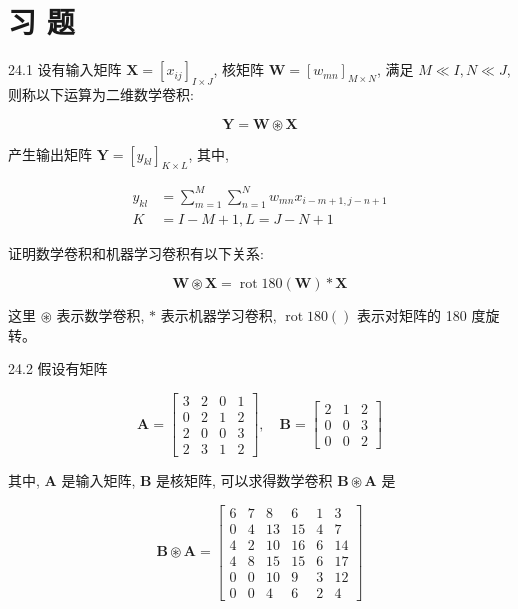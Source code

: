 \documentclass[10pt]{article}
\begin{document}
\section*{习 题}
24.1 设有输入矩阵 $\boldsymbol{X}=\left[x_{i j}\right]_{I \times J}$, 核矩阵 $\boldsymbol{W}=\left[w_{m n}\right]_{M \times N}$, 满足 $M \ll I, N \ll J$, 则称以下运算为二维数学卷积:

$$
\boldsymbol{Y}=\boldsymbol{W} \circledast \boldsymbol{X}
$$

产生输出矩阵 $\boldsymbol{Y}=\left[y_{k l}\right]_{K \times L}$, 其中,

$$
\begin{aligned}
y_{k l} & =\sum_{m=1}^{M} \sum_{n=1}^{N} w_{m n} x_{i-m+1, j-n+1} \\
K & =I-M+1, L=J-N+1
\end{aligned}
$$

证明数学卷积和机器学习卷积有以下关系:

$$
\boldsymbol{W} \circledast \boldsymbol{X}=\operatorname{rot} 180(\boldsymbol{W}) * \boldsymbol{X}
$$

这里 $\circledast$ 表示数学卷积, $*$ 表示机器学习卷积, $\operatorname{rot} 180()$ 表示对矩阵的 180 度旋转。

24.2 假设有矩阵

$$
\boldsymbol{A}=\left[\begin{array}{llll}
3 & 2 & 0 & 1 \\
0 & 2 & 1 & 2 \\
2 & 0 & 0 & 3 \\
2 & 3 & 1 & 2
\end{array}\right], \quad \boldsymbol{B}=\left[\begin{array}{lll}
2 & 1 & 2 \\
0 & 0 & 3 \\
0 & 0 & 2
\end{array}\right]
$$

其中, $\boldsymbol{A}$ 是输入矩阵, $\boldsymbol{B}$ 是核矩阵, 可以求得数学卷积 $\boldsymbol{B} \circledast \boldsymbol{A}$ 是

$$
\boldsymbol{B} \circledast \boldsymbol{A}=\left[\begin{array}{cccccc}
6 & 7 & 8 & 6 & 1 & 3 \\
0 & 4 & 13 & 15 & 4 & 7 \\
4 & 2 & 10 & 16 & 6 & 14 \\
4 & 8 & 15 & 15 & 6 & 17 \\
0 & 0 & 10 & 9 & 3 & 12 \\
0 & 0 & 4 & 6 & 2 & 4
\end{array}\right]
$$
\end{document}
